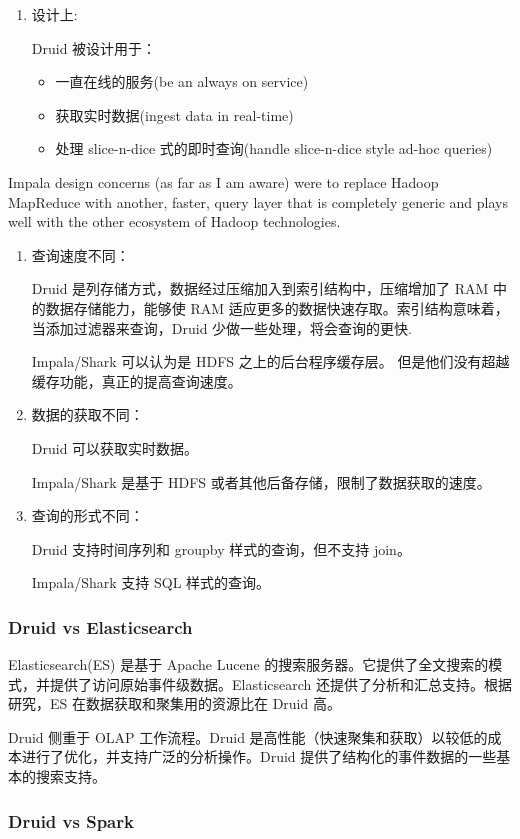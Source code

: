 \documentclass[hyperref, UTF-8]{ctexart}
\begin{document}
\begin{enumerate}
\item 设计上:

Druid 被设计用于：
\begin{itemize}
\item 一直在线的服务(be an always on service)
\item 获取实时数据(ingest data in real-time)
\item 处理 slice-n-dice 式的即时查询(handle slice-n-dice style ad-hoc queries)
\end{itemize}
\end{enumerate}
Impala design concerns (as far as I am aware) were to replace Hadoop MapReduce with another, faster, query layer that is completely generic and plays well with the other ecosystem of Hadoop technologies.
\begin{enumerate}
\item 查询速度不同：

Druid 是列存储方式，数据经过压缩加入到索引结构中，压缩增加了 RAM 中的数据存储能力，能够使 RAM 适应更多的数据快速存取。索引结构意味着，当添加过滤器来查询，Druid 少做一些处理，将会查询的更快.  

Impala/Shark 可以认为是 HDFS 之上的后台程序缓存层。 但是他们没有超越缓存功能，真正的提高查询速度。

\item 数据的获取不同：

Druid 可以获取实时数据。  

Impala/Shark 是基于 HDFS 或者其他后备存储，限制了数据获取的速度。

\item 查询的形式不同：

Druid 支持时间序列和 groupby 样式的查询，但不支持 join。  

Impala/Shark 支持 SQL 样式的查询。
\end{enumerate}
\subsubsection{Druid vs Elasticsearch}
\label{sec:org7e6a0a4}

Elasticsearch(ES) 是基于 Apache Lucene 的搜索服务器。它提供了全文搜索的模式，并提供了访问原始事件级数据。Elasticsearch 还提供了分析和汇总支持。根据研究，ES 在数据获取和聚集用的资源比在 Druid 高。

Druid 侧重于 OLAP 工作流程。Druid 是高性能（快速聚集和获取）以较低的成本进行了优化，并支持广泛的分析操作。Druid 提供了结构化的事件数据的一些基本的搜索支持。
\subsubsection{Druid vs Spark}
\label{sec:org7e4d52f}
\end{document}
